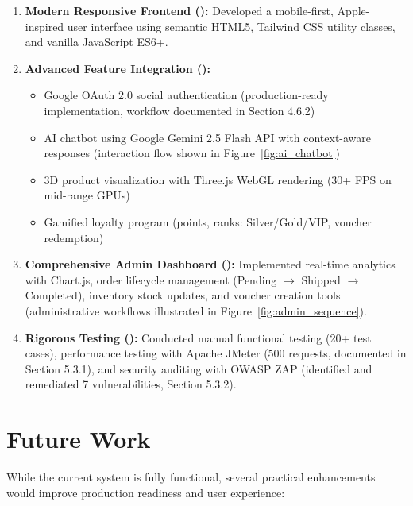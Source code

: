 \documentclass[12pt, a4paper]{report}
\begin{document}
{{\begin{enumerate}
    \item \textbf{Modern Responsive Frontend (\checkmark):} Developed a mobile-first, Apple-inspired user interface using semantic HTML5, Tailwind CSS utility classes, and vanilla JavaScript ES6+.
    
    \item \textbf{Advanced Feature Integration (\checkmark):} 
    \begin{itemize}
        \item Google OAuth 2.0 social authentication (production-ready implementation, workflow documented in Section 4.6.2)
        \item AI chatbot using Google Gemini 2.5 Flash API with context-aware responses (interaction flow shown in Figure~\ref{fig:ai_chatbot})
        \item 3D product visualization with Three.js WebGL rendering (30+ FPS on mid-range GPUs)
        \item Gamified loyalty program (points, ranks: Silver/Gold/VIP, voucher redemption)
    \end{itemize}
    
    \item \textbf{Comprehensive Admin Dashboard (\checkmark):} Implemented real-time analytics with Chart.js, order lifecycle management (Pending $\rightarrow$ Shipped $\rightarrow$ Completed), inventory stock updates, and voucher creation tools (administrative workflows illustrated in Figure~\ref{fig:admin_sequence}).
    
    \item \textbf{Rigorous Testing (\checkmark):} Conducted manual functional testing (20+ test cases), performance testing with Apache JMeter (500 requests, documented in Section 5.3.1), and security auditing with OWASP ZAP (identified and remediated 7 vulnerabilities, Section 5.3.2).
\end{enumerate}





\section{Future Work}

While the current system is fully functional, several practical enhancements would improve production readiness and user experience:


}}
\end{document}
